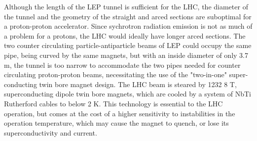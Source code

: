 \indent Although the length of the LEP tunnel is sufficient for the LHC, the diameter of the tunnel and the geometry of the straight and arced sections are suboptimal for a proton-proton accelerator. Since sychrotron radiation emission is not as much of a problem for a protons, the LHC would ideally have longer arced sections. The two counter circulating particle-antiparticle beams of LEP could occupy the same pipe, being curved by the same magnets, but with an inside diameter of only 3.7 m, the tunnel is too narrow to accommodate the two pipes needed for counter circulating proton-proton beams, necessitating the use of the "two-in-one" super-conducting twin bore magnet design. The LHC beam is steared by 1232 8 T, superconducting dipole twin bore magnets, which are cooled by a system of NbTi Rutherford cables to below 2 K. This technology is essential to the LHC operation, but comes at the cost of a higher sensitivity to instabilities in the operation temperature, which may cause the magnet to quench, or lose its superconductivity and current.

